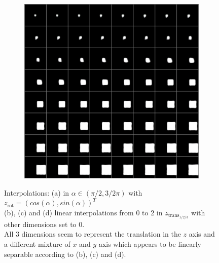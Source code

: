 \documentclass[10pt,a4paper]{article}
\newcommand{\rot}{\ensuremath{\text{rot}\xspace}}
\newcommand{\trans}{\ensuremath{\text{trans}\xspace}}
\begin{document}
\begin{figure}[!ht]
\begin{subfigure}{0.49\textwidth}
        \caption{}
        \label{fig1:subim3}
    \end{subfigure}
    \begin{subfigure}{0.49\textwidth}
        \centering	
        \includegraphics[width=\textwidth] {square_interpolation_z.png}
        \caption{}
        \label{fig1:subim4}
    \end{subfigure}
    \caption{Interpolations: (a) in $\alpha \in (\pi /2, 3/2 \pi)$ with $z_{\rot}= (cos(\alpha), sin(\alpha))^T$\\
        (b), (c) and (d) linear interpolations from 0 to 2 in $z_{\trans_{1/2/3}}$ with other dimensions set to 0.\\
    All 3 dimensions seem to represent the translation in the $z$ axis and a different mixture of $x$ and $y$ axis which appears to be linearly separable according to (b), (c) and (d).} \label{square_ipol}
\end{figure}
\newpage
\end{document}

